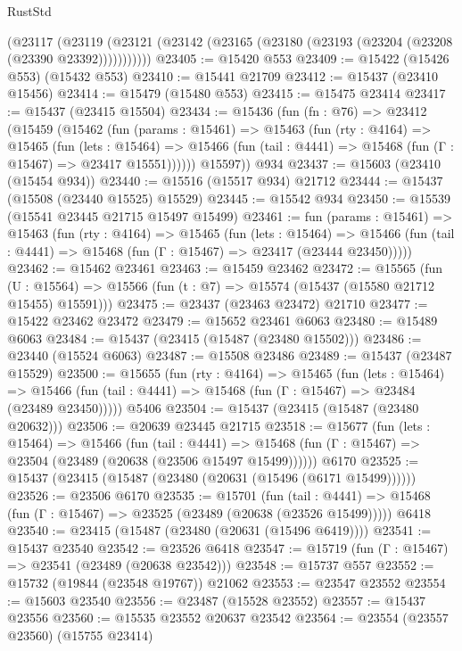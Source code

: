 \begin{lexlean}{RustStd}
\begin{coremodule}
      (@23117
        (@23119 (@23121 (@23142 (@23165 (@23180 (@23193 (@23204 (@23208 (@23390 @23392)))))))))))
@23405 := @15420 @553
@23409 := @15422 (@15426 @553) (@15432 @553)
@23410 := @15441 @21709
@23412 := @15437 (@23410 @15456)
@23414 := @15479 (@15480 @553)
@23415 := @15475 @23414
@23417 := @15437 (@23415 @15504)
@23434 := @15436
    (fun (fn : @76) =>
    @23412
      (@15459
        (@15462
          (fun (params : @15461) =>
          @15463
            (fun (rty : @4164) =>
            @15465
              (fun (lets : @15464) =>
              @15466 (fun (tail : @4441) => @15468 (fun (Γ : @15467) => @23417 @15551))))))
        @15597))
    @934
@23437 := @15603 (@23410 (@15454 @934))
@23440 := @15516 (@15517 @934) @21712
@23444 := @15437 (@15508 (@23440 @15525) @15529)
@23445 := @15542 @934
@23450 := @15539 (@15541 @23445 @21715 @15497 @15499)
@23461 := fun (params : @15461) =>
  @15463
    (fun (rty : @4164) =>
    @15465
      (fun (lets : @15464) =>
      @15466 (fun (tail : @4441) => @15468 (fun (Γ : @15467) => @23417 (@23444 @23450)))))
@23462 := @15462 @23461
@23463 := @15459 @23462
@23472 := @15565
    (fun (U : @15564) => @15566 (fun (t : @7) => @15574 (@15437 (@15580 @21712 @15455) @15591)))
@23475 := @23437 (@23463 @23472) @21710
@23477 := @15422 @23462 @23472
@23479 := @15652 @23461 @6063
@23480 := @15489 @6063
@23484 := @15437 (@23415 (@15487 (@23480 @15502)))
@23486 := @23440 (@15524 @6063)
@23487 := @15508 @23486
@23489 := @15437 (@23487 @15529)
@23500 := @15655
    (fun (rty : @4164) =>
    @15465
      (fun (lets : @15464) =>
      @15466 (fun (tail : @4441) => @15468 (fun (Γ : @15467) => @23484 (@23489 @23450)))))
    @5406
@23504 := @15437 (@23415 (@15487 (@23480 @20632)))
@23506 := @20639 @23445 @21715
@23518 := @15677
    (fun (lets : @15464) =>
    @15466
      (fun (tail : @4441) =>
      @15468 (fun (Γ : @15467) => @23504 (@23489 (@20638 (@23506 @15497 @15499))))))
    @6170
@23525 := @15437 (@23415 (@15487 (@23480 (@20631 (@15496 (@6171 @15499))))))
@23526 := @23506 @6170
@23535 := @15701
    (fun (tail : @4441) => @15468 (fun (Γ : @15467) => @23525 (@23489 (@20638 (@23526 @15499)))))
    @6418
@23540 := @23415 (@15487 (@23480 (@20631 (@15496 @6419))))
@23541 := @15437 @23540
@23542 := @23526 @6418
@23547 := @15719 (fun (Γ : @15467) => @23541 (@23489 (@20638 @23542)))
@23548 := @15737 @557
@23552 := @15732 (@19844 (@23548 @19767)) @21062
@23553 := @23547 @23552
@23554 := @15603 @23540
@23556 := @23487 (@15528 @23552)
@23557 := @15437 @23556
@23560 := @15535 @23552 @20637 @23542
@23564 := @23554 (@23557 @23560) (@15755 @23414)

\end{coremodule}
\end{lexlean}
